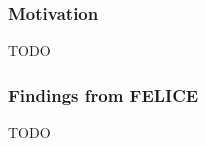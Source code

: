 \documentclass[9pt,conference]{IEEEtran}
\begin{document}
    \subsubsection{Motivation}
    TODO

    \subsubsection{Findings from FELICE}
    TODO

\end{document}
